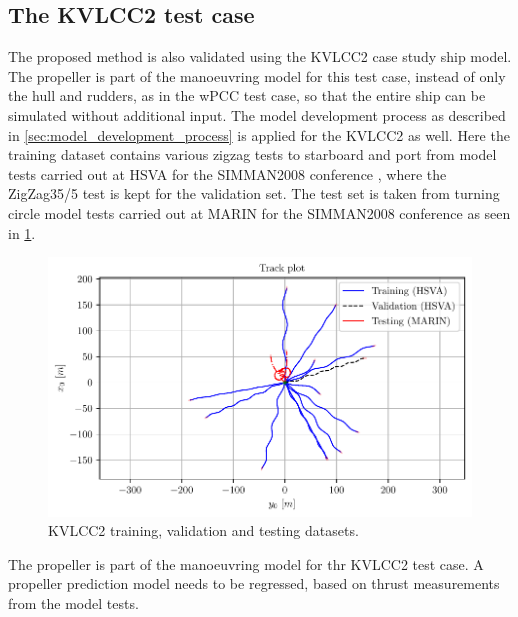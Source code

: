 

\subsection{The KVLCC2 test case}
\label{\detokenize{05.01_case_studies:the-kvlcc2-test-scenarios}}

The proposed method is also validated using the KVLCC2 case study ship model.
The propeller is part of the manoeuvring model for this test case, instead of only the hull and rudders, as in the wPCC test case, so that the entire ship can be simulated without additional input.
The model development process as described in \autoref{sec:model_development_process} is applied for the KVLCC2 as well.
Here the training dataset contains various zigzag tests to starboard and port from model tests carried out at HSVA for the SIMMAN2008 conference \cite{stern_experience_2011}, where the ZigZag35/5 test is kept for the validation set. The test set is taken from turning circle model tests carried out at MARIN for the SIMMAN2008 conference \cite{stern_experience_2011} as seen in \ref{fig:kvlcc2_datasets}.

\begin{figure}[!htb]
\centering
\includegraphics[width=\linewidth]{kappa/images/4.pdf}
\caption{KVLCC2 training, validation and testing datasets.}\label{fig:kvlcc2_datasets}\end{figure}

The propeller is part of the manoeuvring model for thr KVLCC2 test case. A propeller prediction model needs to be regressed, based on thrust measurements from the model tests.


